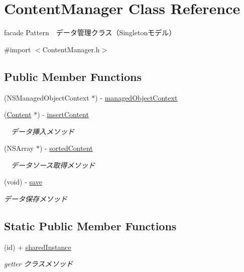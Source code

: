 \hypertarget{interface_content_manager}{\section{Content\-Manager Class Reference}
\label{interface_content_manager}
}


facade Pattern　データ管理クラス（\-Singletonモデル）  




{\ttfamily \#import $<$Content\-Manager.\-h$>$}

\subsection*{Public Member Functions}
\begin{DoxyCompactItemize}
\item 
(N\-S\-Managed\-Object\-Context $\ast$) -\/ \hyperlink{interface_content_manager_ae89287752fd7a1b93bdd03c053421da9}{managed\-Object\-Context}
\item 
(\hyperlink{interface_content}{Content} $\ast$) -\/ \hyperlink{interface_content_manager_a15093584991c20abb7249a8b1d2804ac}{insert\-Content}
\begin{DoxyCompactList}\small\item\em 　データ挿入メソッド \end{DoxyCompactList}\item 
(N\-S\-Array $\ast$) -\/ \hyperlink{interface_content_manager_a04c24d37bca6cf275aa2663cef656be5}{sorted\-Content}
\begin{DoxyCompactList}\small\item\em 　データソース取得メソッド \end{DoxyCompactList}\item 
\hypertarget{interface_content_manager_adcc8609b96c6e73640e6899d00f457e6}{(void) -\/ \hyperlink{interface_content_manager_adcc8609b96c6e73640e6899d00f457e6}{save}}\label{interface_content_manager_adcc8609b96c6e73640e6899d00f457e6}

\begin{DoxyCompactList}\small\item\em データ保存メソッド \end{DoxyCompactList}\end{DoxyCompactItemize}
\subsection*{Static Public Member Functions}
\begin{DoxyCompactItemize}
\item 
(id) + \hyperlink{interface_content_manager_a243895aec0970f085fe8d47c5ea8e80a}{shared\-Instance}
\begin{DoxyCompactList}\small\item\em getter クラスメソッド \end{DoxyCompactList}\end{DoxyCompactItemize}
